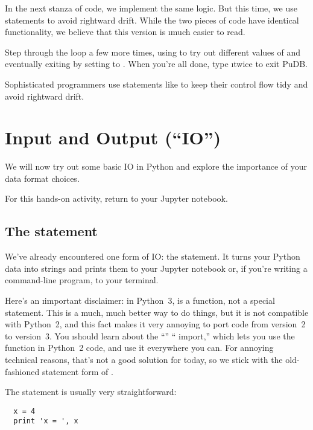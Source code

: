 \documentclass[letterpaper, 12pt, titlepage, twoside]{article}
\begin{document}
In the next stanza of code, we implement the same logic. But this time, we use
 statements to avoid rightward drift. While the two pieces of code
have identical functionality, we believe that this version is \i{much} easier
to read.

\typeit Step through the loop a few more times, using  to try out
different values of  and eventually exiting by setting
 to . When you're all done, type  \i{twice} to
exit PuDB.

Sophisticated programmers use statements like  to keep their
control flow tidy and avoid rightward drift.


\newpage
\section{Input and Output (``IO'')}

We will now try out some basic IO in Python and explore the importance of your
data format choices.

For this hands-on activity, return to your Jupyter notebook.

\subsection*{The  statement}

We've already encountered one form of IO: the  statement. It turns
your Python data into strings and prints them to your Jupyter notebook or, if
you're writing a command-line program, to your terminal.

Here's an \i{important disclaimer:} in Python~3,  is a function,
not a special statement. This is a much, much better way to do things, but it
is not compatible with Python~2, and this fact makes it very annoying to port
code from version~2 to version~3. You \i{should} learn about the
``'' `` import,'' which lets you use the
 function in Python~2 code, and use it everywhere you can. For
annoying technical reasons, that's not a good solution for today, so we stick
with the old-fashioned statement form of .

The  statement is usually very straightforward:

\begin{lstlisting}
  x = 4
  print 'x = ', x
\end{lstlisting}
\end{document}
